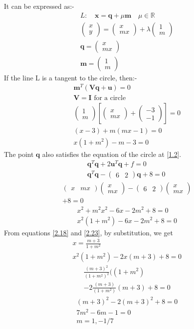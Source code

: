 \documentclass[journal,12pt,twocolumn]{IEEEtran}
\let\vec\mathbf
\numberwithin{equation}{subsection}
\newcommand{\myvec}[1]{\ensuremath{\begin{pmatrix}#1\end{pmatrix}}}
\begin{document}
It can be expressed as:-
\begin{align}
L: \quad \vec{x} = \vec{q} + \mu \vec{m} \quad \mu \in \mathbb{R} \label{2.10} \\
\myvec{x \\ y}=\myvec{x \\ mx} + \lambda \myvec{1\\m} \\
\vec{q}=\myvec{x\\ mx} \\
\vec{m}=\myvec{1\\m}
\end{align}
If the line L is a tangent to the circle, then:-
\begin{align}
\vec{m}^T(\vec{V}\vec{q} +\vec{u}) = 0 \\
\vec{V} = \vec{I} \text{ for a circle} \\
\myvec{1 \\ m} \left[ \myvec{x \\ mx}+ \myvec{-3 \\ -1} \right] = 0\\
(x -3 ) + m(mx-1) =0\\
x(1+m^2) -m -3 =0 \label{2.18}
\end{align}
The point $\vec{q}$ also satisfies the equation of the circle at \ref{1.2}.
\begin{align}
\vec{q}^T\vec{q}+ 2\vec{u}^T\vec{q} + f = 0 \\
\vec{q}^T\vec{q}-\myvec{6 &  2}\vec{q}+8 = 0 \
\end{align}
\begin{multline}
\myvec{x & mx}\myvec{x \\ mx}-\myvec{6 &  2}\myvec{x \\mx}\\+8 = 0
\end{multline}
\begin{align}
x^2 + m^2x^2 -6x -2m^2+8=0\\
x^2(1+m^2) -6x -2m^2+8=0 \label{2.23}
\end{align}
From equations \ref{2.18} and \ref{2.23}, by substitution, we get
\begin{align}
x = \frac{m+3}{1+m^2}\\
x^2(1+m^2) -2x(m+3)+8=0
\end{align}
\begin{multline}
\frac{(m+3)^2}{(1+m^2)^2} ((1+m^2)\\ -2\frac{(m+3)}{(1+m^2)}(m+3)+8 =0
\end{multline}
\begin{align}
(m+3)^2 -2(m+3)^2 + 8=0\\
7m^2-6m-1 = 0\\
m = 1 , -1/7
\end{align}
\end{document}
